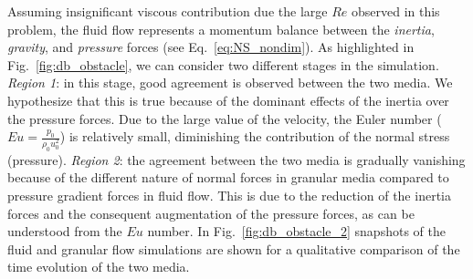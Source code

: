 Assuming insignificant viscous contribution due the large $Re$ observed in this problem, the fluid flow represents a momentum balance between the \textit{inertia}, \textit{gravity}, and \textit{pressure} forces (see Eq.~\ref{eq:NS_nondim}). As highlighted in Fig.~\ref{fig:db_obstacle}, we can consider two different stages in the simulation. \textit{Region 1}: in this stage, good agreement is observed between the two media. We hypothesize that this is true because of the dominant effects of the inertia over the pressure forces. Due to the large value of the velocity, the Euler number ($Eu=\frac{p_0}{\rho_0 u_0^2}$) is relatively small, diminishing the contribution of the normal stress (pressure). \textit{Region 2}: the agreement between the two media is gradually vanishing because of the different nature of normal forces in granular media compared to pressure gradient forces in fluid flow. This is due to the reduction of the inertia forces and the consequent augmentation of the pressure forces, as can be understood from the $Eu$ number.  In Fig.~\ref{fig:db_obstacle_2} snapshots of the fluid and granular flow simulations are shown for a qualitative comparison of the time evolution of the two media.

